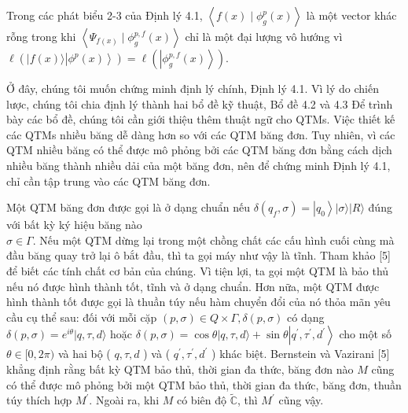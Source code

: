 \documentclass[10pt]{article}
\begin{document}
Trong các phát biểu 2-3 của Định lý 4.1, $\left\langle f(x) \mid \phi_{g}^{p}(x)\right\rangle$ là một vector khác rỗng trong khi $\left\langle\Psi_{f(x)} \mid \phi_{g}^{p, f}(x)\right\rangle$ chỉ là một đại lượng vô hướng vì $\ell\left(|f(x)\rangle\left|\phi^{p}(x)\right\rangle\right)=\ell\left(\left|\phi_{g}^{p, f}(x)\right\rangle\right)$.

Ở đây, chúng tôi muốn chứng minh định lý chính, Định lý 4.1. Vì lý do chiến lược, chúng tôi chia định lý thành hai bổ đề kỹ thuật, Bổ đề 4.2 và 4.3 Để trình bày các bổ đề, chúng tôi cần giới thiệu thêm thuật ngữ cho QTMs. Việc thiết kế các QTMs nhiều băng dễ dàng hơn so với các QTM băng đơn. Tuy nhiên, vì các QTM nhiều băng có thể được mô phỏng bởi các QTM băng đơn bằng cách dịch nhiều băng thành nhiều dải của một băng đơn, nên để chứng minh Định lý 4.1, chỉ cần tập trung vào các QTM băng đơn.

Một QTM băng đơn được gọi là ở dạng chuẩn nếu $\delta\left(q_{f}, \sigma\right)=\left|q_{0}\right\rangle|\sigma\rangle|R\rangle$ đúng với bất kỳ ký hiệu băng nào\\
$\sigma \in \Gamma$. Nếu một QTM dừng lại trong một chồng chất các cấu hình cuối cùng mà đầu băng quay trở lại ô bắt đầu, thì ta gọi máy như vậy là tĩnh. Tham khảo [5] để biết các tính chất cơ bản của chúng. Vì tiện lợi, ta gọi một QTM là bảo thủ nếu nó được hình thành tốt, tĩnh và ở dạng chuẩn. Hơn nữa, một QTM được hình thành tốt được gọi là thuần túy nếu hàm chuyển đổi của nó thỏa mãn yêu cầu cụ thể sau: đối với mỗi cặp $(p, \sigma) \in Q \times \Gamma, \delta(p, \sigma)$ có dạng $\delta(p, \sigma)=e^{i \theta}|q, \tau, d\rangle$ hoặc $\delta(p, \sigma)=\cos \theta|q, \tau, d\rangle+\sin \theta\left|q^{\prime}, \tau^{\prime}, d^{\prime}\right\rangle$ cho một số $\theta \in[0,2 \pi)$ và hai bộ ( $q, \tau, d$ ) và ( $q^{\prime}, \tau^{\prime}, d^{\prime}$ ) khác biệt. Bernstein và Vazirani [5] khẳng định rằng bất kỳ QTM bảo thủ, thời gian đa thức, băng đơn nào $M$ cũng có thể được mô phỏng bởi một QTM bảo thủ, thời gian đa thức, băng đơn, thuần túy thích hợp $M^{\prime}$. Ngoài ra, khi $M$ có biên độ $\tilde{\mathbb{C}}$, thì $M^{\prime}$ cũng vậy.
\end{document}
